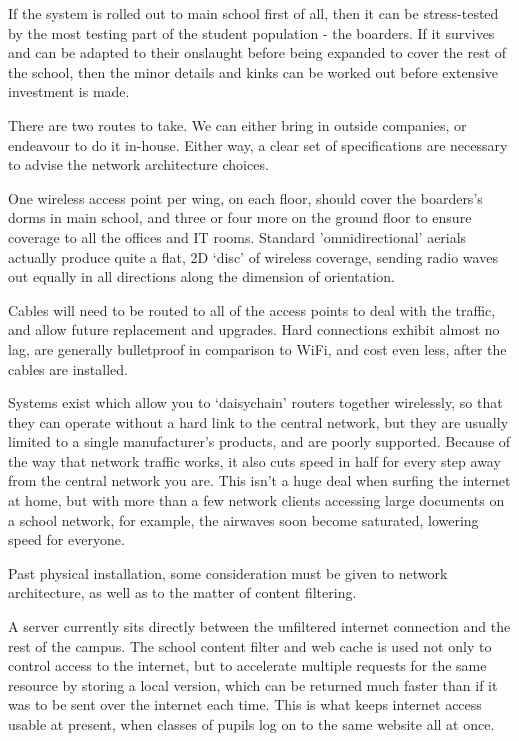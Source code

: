 \documentclass[a4paper,leqno,titlepage]{article}
\begin{document}
If the system is rolled out to main school first of all, then it can be
stress-tested by the most testing part of the student population - the boarders.
If it survives and can be adapted to their onslaught before being expanded to
cover the rest of the school, then the minor details and kinks can be worked out
before extensive investment is made.


There are two routes to take. We can either bring in outside companies, or
endeavour to do it in-house. Either way, a clear set of specifications are
necessary to advise the network architecture choices.


One wireless access point per wing, on each floor, should cover the boarders's
dorms in main school, and three or four more on the ground floor to ensure
coverage to all the offices and IT rooms. Standard 'omnidirectional' aerials
actually produce quite a flat, 2D `disc' of wireless coverage, sending radio
waves out equally in all directions along the dimension of orientation.


Cables will need to be routed to all of the access points to deal with the
traffic, and allow future replacement and upgrades. Hard connections exhibit
almost no lag, are generally bulletproof in comparison to WiFi, and cost even
less, after the cables are installed.


Systems exist which allow you to `daisychain' routers together wirelessly,
so that they can operate without a hard link to the central network, but they are
usually limited to a single manufacturer's products, and are poorly supported.
Because of the way that network traffic works, it also cuts speed in half for
every step away from the central network you are. This isn't a huge deal when
surfing the internet at home, but with more than a few network clients accessing
large documents on a school network, for example, the airwaves soon become
saturated, lowering speed for everyone.


Past physical installation, some consideration must be given to network
architecture, as well as to the matter of content filtering.

A server currently sits directly between the unfiltered internet connection and
the rest of the campus. The school content filter and web cache is used not only
to control access to the internet, but to accelerate multiple requests for the
same resource by storing a local version, which can be returned much faster than
if it was to be sent over the internet each time. This is what keeps internet
access usable at present, when classes of pupils log on to the same website
all at once.
\end{document}
